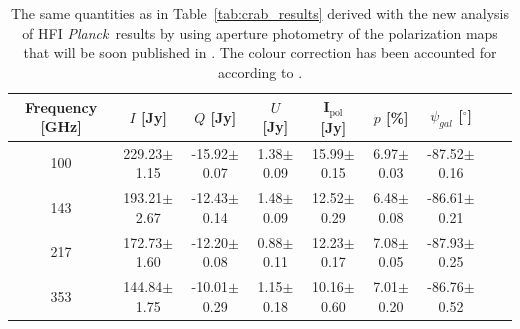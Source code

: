 \documentclass[twocolumn,traditabstract]{aa}
\def\Planck{\textit{Planck}}
\begin{document}
 \begin{table}[h!]
  \centering
      \begin{tabular}{ccccccccc}
      \hline
      \hline
       Frequency [GHz] & \small $I$ [Jy] & \small $Q$ [Jy] & \small $U$ [Jy] & \small I$_\textrm{pol}$ [Jy] & \small $p$ [\%] & \small $\psi_{gal}$ [$^\circ$] \\
      \hline

\small 100 & \small 229.23$\pm$1.15  & \small -15.92$\pm$0.07 & \small 1.38$\pm$0.09 & \small 15.99$\pm$0.15 & \small 6.97$\pm$0.03 & \small -87.52$\pm$0.16  \\ 
\small 143 & \small 193.21$\pm$2.67  & \small -12.43$\pm$0.14 & \small 1.48$\pm$0.09 & \small 12.52$\pm$0.29 & \small 6.48$\pm$0.08 & \small -86.61$\pm$0.21  \\
\small 217 & \small 172.73$\pm$1.60  & \small -12.20$\pm$0.08 & \small 0.88$\pm$0.11 & \small 12.23$\pm$0.17 & \small 
7.08$\pm$0.05 & \small -87.93$\pm$0.25  \\
\small 353 & \small 144.84$\pm$1.75  & \small -10.01$\pm$0.29 & \small 1.15$\pm$0.18 & \small 10.16$\pm$0.60 & \small 7.01$\pm$0.20 & \small -86.76$\pm$0.52 \\
    \hline            
    \hline   
    \end{tabular}
      \caption{The same quantities as in Table~\ref{tab:crab_results} derived with the new analysis of HFI \Planck\ results by using aperture photometry of the polarization maps that will be soon published in \cite{planck2018}. The colour correction has been accounted for according to \cite{planckhfispectral}.}
    \label{tab:planck_results}
 \end{table}
\end{document}
